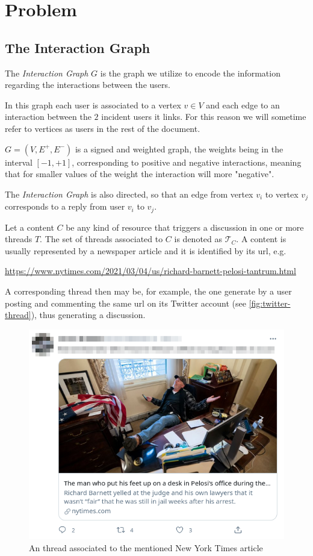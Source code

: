 \section{Problem}
\label{sec:problem}

\subsection{The Interaction Graph}
\label{sub:interaction-graph}

The \emph{Interaction Graph} $G$ is the graph we utilize to encode the
information regarding the interactions between the users.

In this graph each user is associated to a vertex $v \in V$ and each edge to
an interaction between the $2$ incident users it links. For this reason we
will sometime refer to vertices as users in the rest of the document.

$G = (V, E^{+}, E^{-})  $ is a
signed and weighted graph, the weights being in the interval $[-1, +1]$,
corresponding to positive and negative interactions, meaning that for smaller
values of the weight the interaction will more "negative".

The \emph{Interaction Graph} is also directed, so that an edge from vertex $v_{i}
$ to vertex $v_{j} $ corresponds to a reply from user $v_{i} $ to $v_{j} $.

Let a content $C$ be any kind of resource that triggers a discussion in one or
more threads $T$. The set of threads associated to $C$ is denoted as
$\mathcal{T}_{C} $. A content is usually represented by a newspaper article and
it is identified by its url, e.g.

	{\footnotesize
		\begin{center}
			\url{https://www.nytimes.com/2021/03/04/us/richard-barnett-pelosi-tantrum.html}
		\end{center}
	}

A corresponding thread then may be, for example, the one generate by a user
posting and commenting the same url on its Twitter account (see
\autoref{fig:twitter-thread}), thus generating a discussion.

\begin{figure}
	\centering
	\includegraphics[width=0.6\linewidth]{tex/img/twitter_thread.png}
	\caption[Thread-content distinction example from Twitter]{An thread associated to the mentioned New York Times article}%
	\label{fig:twitter-thread}
\end{figure}

